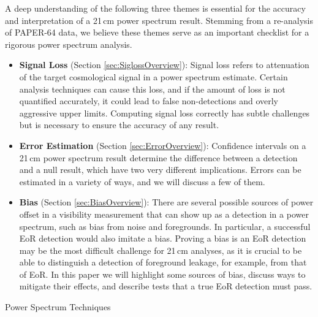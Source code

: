 \documentclass[preprint2,numberedappendix,tighten]{aastex6}  %
\begin{document}
A deep understanding of the following three themes is essential for the accuracy and interpretation of a 21\,cm power 
spectrum result. Stemming from a re-analysis of PAPER-64 data, we believe these themes serve as an important checklist for 
a rigorous power spectrum analysis.
\begin{itemize}
\item \textbf{Signal Loss} (Section \ref{sec:SiglossOverview}): Signal loss refers to attenuation of the target cosmological signal 
in a power spectrum estimate. Certain analysis techniques can cause this loss, and if the amount of loss is not quantified accurately, it could lead to false non-detections and overly aggressive upper limits. Computing signal loss correctly has subtle challenges but is necessary to ensure the accuracy of any result. 
\item \textbf{Error Estimation} (Section \ref{sec:ErrorOverview}): Confidence intervals on a 21\,cm power spectrum result 
determine the difference between a detection and a null result, which have two very different implications. Errors can be 
estimated in a variety of ways, and we will discuss a few of them.
\item \textbf{Bias} (Section \ref{sec:BiasOverview}): There are several possible sources of power offset in a visibility 
measurement that can show up as a detection in a power spectrum, such as bias from noise and foregrounds. In particular, a 
successful EoR detection would also imitate a bias. Proving a bias is an EoR detection may be the most difficult challenge for 21\,cm 
analyses, as it is crucial to be able to distinguish a detection of foreground leakage, for example, from that of EoR. In this paper 
we will highlight some sources of bias, discuss ways to mitigate their effects, and describe tests that a true EoR detection must 
pass.
\end{itemize}

\begin{center}
Power Spectrum Techniques
\end{center}
\end{document}

